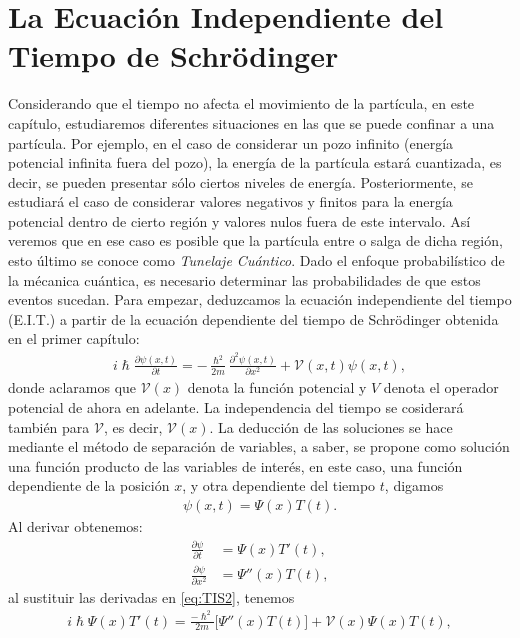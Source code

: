 \documentclass[12pt]{article}
\theoremstyle{definition}
\begin{document}
\section{La Ecuación Independiente del Tiempo de Schrödinger}
\noindent
Considerando que el tiempo no afecta el movimiento de la partícula, en este capítulo, estudiaremos diferentes situaciones en las que se puede confinar a una partícula. Por ejemplo, en el caso de considerar un pozo infinito (energía potencial infinita fuera del pozo), la energía de la partícula estará cuantizada, es decir, se pueden presentar sólo ciertos niveles de energía. Posteriormente, se estudiará el caso de considerar valores negativos y finitos para la energía potencial dentro de cierto región y valores nulos fuera de este intervalo. Así veremos que en ese caso es posible que la partícula entre o salga de dicha región, esto último se conoce como \textit{Tunelaje Cuántico}. Dado el enfoque probabilístico de la mécanica cuántica, es necesario determinar las probabilidades de que estos eventos sucedan.
Para empezar, deduzcamos la ecuación independiente del tiempo (E.I.T.)
a partir de la ecuación dependiente del tiempo de Schrödinger obtenida en el primer capítulo:
\begin{align}
    i\hslash\frac{\partial\psi(x,t)}{\partial t} = 
    -\frac{\hslash^2}{2m}\frac{\partial^2\psi(x,t)}{\partial x^2} + \mathcal{V}(x,t)\psi(x,t) ,
    \label{eq:TIS2}
\end{align}
 donde aclaramos que $\mathcal{V}(x)$ denota la función potencial y $V$ denota el operador potencial de ahora en adelante. La independencia del tiempo  se cosiderará también para $\mathcal{V}$, es decir, $\mathcal{V}(x)$. La deducción de las soluciones se hace mediante el método de separación de variables, a saber, se propone como solución una función producto de las variables de interés, en este caso, una función dependiente de la posición $x$, y otra dependiente del tiempo $t$, digamos
\begin{align*}
    \psi(x,t) = \Psi(x)T(t).
\end{align*}
Al derivar obtenemos:
\begin{align*}
    \frac{\partial\psi}{\partial t} & = \Psi(x)T'(t),
    \\
    \frac{\partial\psi}{\partial x^2} & = \Psi''(x)T(t),
\end{align*}
al sustituir las derivadas en \eqref{eq:TIS2}, tenemos
\begin{align*}
   i\hslash \Psi(x)T'(t) = \frac{-\hslash ^2}{2m}\bigg[\Psi''(x)T(t)\bigg] + \mathcal{V}(x)\Psi(x)T(t),\end{align*}
\end{document}

